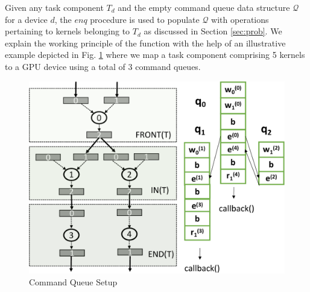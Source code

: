     Given any task component $T_d$ and the empty command queue data structure $\mathcal{Q}$ for a device $d$, the $enq$ procedure is used to populate  $\mathcal{Q}$ with operations pertaining to kernels belonging to $T_d$ as discussed in Section \ref{sec:prob}.  We explain the working principle of the function with the help of an illustrative example depicted in Fig. \ref{fig:dispatch} where we map a task component comprising 5 kernels to a GPU device using a total of 3 command queues. 
	\begin{figure}[ht]
		\centering
		\includegraphics[scale=0.45]{Pictures/TaskObject.pdf}
		\caption{\small Command Queue Setup\label{fig:dispatch}}
	\end{figure}
